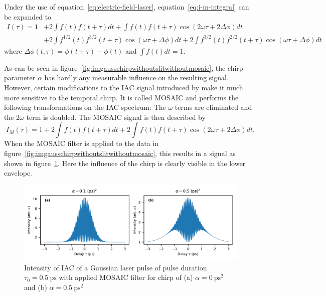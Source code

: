 Under the use of equation~\ref{eq:electric-field-laser}, equation~\eqref{eq:i-m-integral} can be expanded to
\begin{align}
I(\tau) = 1 &+ 2 \int f(t) f(t + \tau) dt + \int f(t) f(t + \tau) \cos(2 \omega \tau + 2 \Delta \phi) dt \nonumber\\
&+ 2 \int f^{1/2}(t) f^{3/2}(t + \tau) \cos(\omega \tau + \Delta \phi) dt + 2 \int f^{3/2}(t) f^{2/2}(t + \tau) \cos(\omega \tau + \Delta \phi) dt
\end{align}
where $\Delta \phi(t, \tau) = \phi(t + \tau) - \phi(t)$ and $\int f(t) dt = 1$.

As can be seen in figure~\ref{fig:imgausschirpwithoutslitwithoutmosaic}, the chirp parameter $\alpha$ has hardly any measurable influence on the resulting signal.
However, certain modifications to the \ac{IAC} signal introduced by \textcite{hirayama_real-time_2002} make it much more sensitive to the temporal chirp.
It is called \ac{MOSAIC} and performs the following transformations on the \ac{IAC} spectrum: The $\omega$ terms are eliminated and the $2\omega$ term is doubled.
The \ac{MOSAIC} signal is then described by
\begin{equation}
\label{eq:i-m-filtered}
I_{M}(\tau) = 1 + 2 \int f(t) f(t + \tau) dt + 2 \int f(t) f(t + \tau) \cos(2\omega \tau + 2\Delta \phi) dt.
\end{equation}
When the MOSAIC filter is applied to the data in figure~\ref{fig:imgausschirpwithoutslitwithoutmosaic}, this results in a signal as shown in figure~\ref{fig:mosaicchirpedlaserpulse}.
Here the influence of the chirp is clearly visible in the lower envelope.
\begin{figure}[H]
	\centering
	\includegraphics[width=\linewidth]{figures/chirp/plots/mosaic_chirped_laser_pulse}
	\caption{Intensity of IAC of a Gaussian laser pulse of pulse duration $\tau_0=\SI{0.5}{\pico \second}$ with applied MOSAIC filter for chirp of (a) $\alpha = \SI{0}{\pico \second \squared}$ and (b) $\alpha = \SI{0.5}{\pico \second \squared}$}
	\label{fig:mosaicchirpedlaserpulse}
\end{figure}

